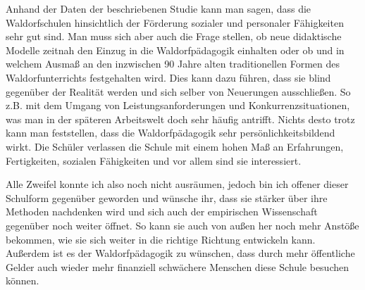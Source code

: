 Anhand der Daten der beschriebenen Studie kann man sagen, dass die Waldorfschulen hinsichtlich der Förderung sozialer und personaler Fähigkeiten sehr gut sind. Man muss sich aber auch die Frage stellen, ob neue didaktische Modelle zeitnah den Einzug in die Waldorfpädagogik einhalten oder ob und in welchem Ausmaß an den inzwischen 90 Jahre alten traditionellen Formen des Waldorfunterrichts festgehalten wird. Dies kann dazu führen, dass sie blind gegenüber der Realität werden und sich selber von Neuerungen ausschließen.  So z.B. mit dem Umgang von Leistungsanforderungen und Konkurrenzsituationen, was man in der späteren Arbeitswelt doch sehr häufig antrifft. Nichts desto trotz kann man feststellen, dass die Waldorfpädagogik sehr persönlichkeitsbildend wirkt. Die Schüler verlassen die Schule mit einem hohen Maß an Erfahrungen, Fertigkeiten, sozialen Fähigkeiten und vor allem sind sie interessiert. 

Alle Zweifel konnte ich also noch nicht ausräumen, jedoch bin ich offener dieser Schulform gegenüber geworden und wünsche ihr, dass sie stärker über ihre Methoden nachdenken wird und sich auch der empirischen Wissenschaft gegenüber noch weiter öffnet. So kann sie auch von außen her noch mehr Anstöße bekommen, wie sie sich weiter in die richtige Richtung entwickeln kann. Außerdem ist es der Waldorfpädagogik zu wünschen, dass durch mehr öffentliche Gelder auch wieder mehr finanziell schwächere Menschen diese Schule besuchen können. 



